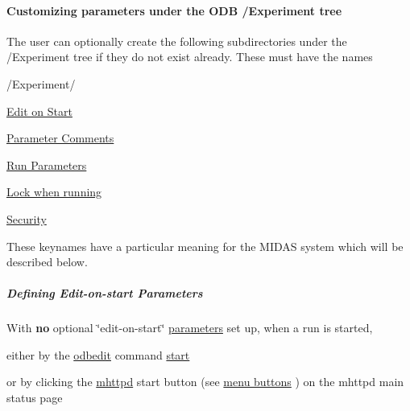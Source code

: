 \label{RC_customize_ODB_idx_ODB_tree_Experiment_Customize}
\hypertarget{RC_customize_ODB_idx_ODB_tree_Experiment_Customize}{}
 \label{RC_customize_ODB_idx_ODB_tree_Experiment_Parameter-comments}
\hypertarget{RC_customize_ODB_idx_ODB_tree_Experiment_Parameter-comments}{}
\hypertarget{RC_customize_ODB_RC_customize_experiment_tree}{}\paragraph{Customizing parameters under the ODB /Experiment tree}\label{RC_customize_ODB_RC_customize_experiment_tree}
The user can optionally create the following subdirectories under the /Experiment tree if they do not exist already. These must have the names {\bfseries 
\begin{DoxyItemize}
\item /Experiment/
\begin{DoxyItemize}
\item \hyperlink{RC_customize_ODB_RC_Edit_On_Start}{Edit on Start}
\item \hyperlink{RC_customize_ODB_RC_parameter_comments}{Parameter Comments}
\item \hyperlink{RC_customize_ODB_RC_Run_Parameters}{Run Parameters}
\item \hyperlink{RC_customize_ODB_RC_Lock_when_Running}{Lock when running}
\item \hyperlink{RC_customize_ODB_RC_Access_Control}{Security}
\end{DoxyItemize}
\end{DoxyItemize}}

{\bfseries } These keynames have a particular meaning for the MIDAS system which will be described below.

\par


\par
 \label{RC_customize_ODB_idx_run_start_parameters}
\hypertarget{RC_customize_ODB_idx_run_start_parameters}{}
\hypertarget{RC_customize_ODB_RC_Edit_On_Start}{}\subparagraph{Defining Edit-\/on-\/start Parameters}\label{RC_customize_ODB_RC_Edit_On_Start}
With {\bfseries no} optional \char`\"{}edit-\/on-\/start\char`\"{} \hyperlink{structparameters}{parameters} set up, when a run is started,
\begin{DoxyItemize}
\item either by the \hyperlink{RC_odbedit_utility}{odbedit} command \hyperlink{RC_odbedit_examples_RC_odbedit_start}{start}
\item or by clicking the \hyperlink{RC_mhttpd_utility}{mhttpd} start button (see \hyperlink{RC_mhttpd_status_page_features_RC_mhttpd_status_menu_buttons}{menu buttons} ) on the mhttpd main status page
\end{DoxyItemize}

